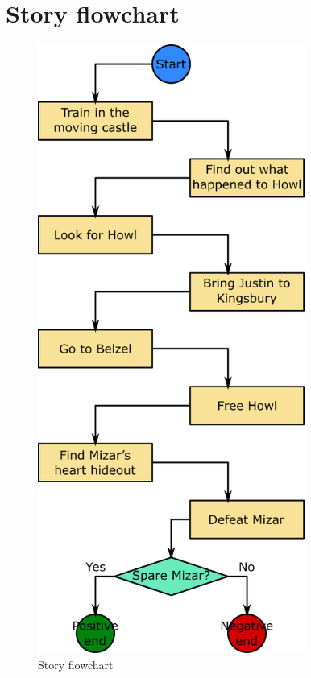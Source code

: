 \section{Story flowchart}

\begin{figure}[H]
  \centering
  \includegraphics[width=\textwidth,height=20cm,keepaspectratio]{Images/SVG/Exported/storyFlowchart}
  \caption{Story flowchart}
\end{figure}
